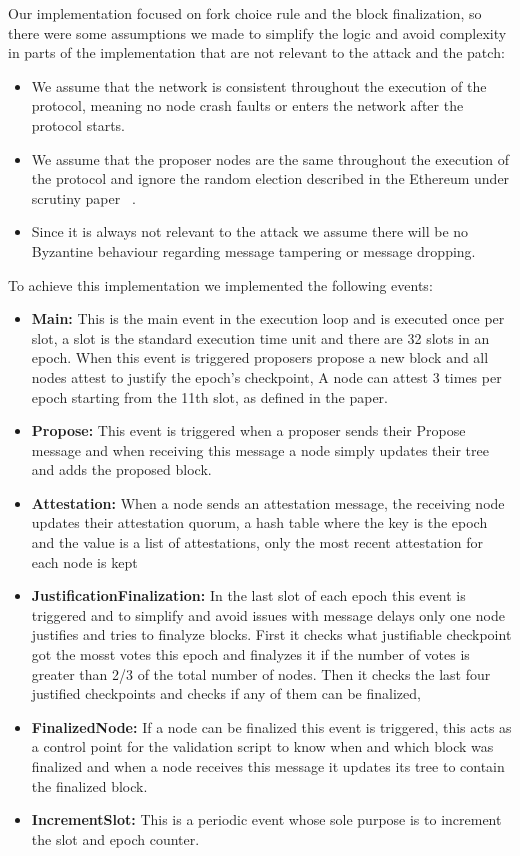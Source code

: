 Our implementation focused on fork choice rule and the block finalization, so there were some assumptions we made
to simplify the logic and avoid complexity in parts of the implementation that are not relevant to the attack and the patch:
\begin{itemize}
    \item We assume that the network is consistent throughout the execution of the protocol, meaning no node crash faults
or enters the network after the protocol starts.
    \item We assume that the proposer nodes are the same throughout the execution of the protocol and ignore the random election
described in the Ethereum under scrutiny paper ~\cite{ethereum_analysis}.
    \item Since it is always not relevant to the attack we assume there will be no Byzantine behaviour regarding message
tampering or message dropping.
\end{itemize}

To achieve this implementation we implemented the following events:

\begin{itemize}
    \item \textbf{Main:} This is the main event in the execution loop and is executed once per slot, a slot is the standard execution time unit and
    there are 32 slots in an epoch. When this event is triggered proposers propose a new block and all nodes attest to justify the epoch's checkpoint,
    A node can attest 3 times per epoch starting from the 11th slot, as defined in the paper.
    \item \textbf{Propose:} This event is triggered when a proposer sends their Propose message and when receiving this message a node simply updates their tree
    and adds the proposed block.
    \item \textbf{Attestation:} When a node sends an attestation message, the receiving node updates their attestation quorum, a hash table where the key is
    the epoch and the value is a list of attestations, only the most recent attestation for each node is kept
    \item \textbf{JustificationFinalization:} In the last slot of each epoch this event is triggered and to simplify and avoid issues with message delays only
    one node justifies and tries to finalyze blocks. First it checks what justifiable checkpoint got the mosst votes this epoch and finalyzes it if the number
    of votes is greater than 2/3 of the total number of nodes. Then it checks the last four justified checkpoints and checks if any of them can be finalized,
    \item \textbf{FinalizedNode:} If a node can be finalized this event is triggered, this acts as a control point for the validation script to know when and which block
    was finalized and when a node receives this message it updates its tree to contain the finalized block.
    \item \textbf{IncrementSlot:} This is a periodic event whose sole purpose is to increment the slot and epoch counter.
\end{itemize}

